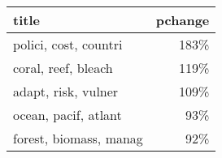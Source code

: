 \begin{tabular}{p{1.2cm}r}
\toprule
                  title &  pchange \\
\midrule
  polici, cost, countri &     183\% \\
    coral, reef, bleach &     119\% \\
    adapt, risk, vulner &     109\% \\
   ocean, pacif, atlant &      93\% \\
 forest, biomass, manag &      92\% \\
\bottomrule
\end{tabular}
